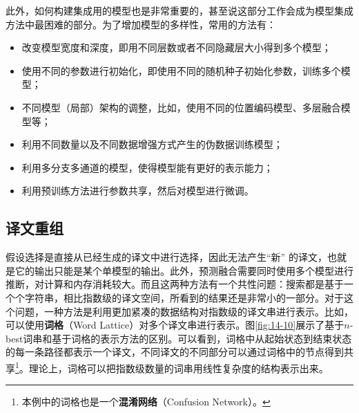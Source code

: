 \parinterval 此外，如何构建集成用的模型也是非常重要的，甚至说这部分工作会成为模型集成方法中最困难的部分。为了增加模型的多样性，常用的方法有：

\begin{itemize}
\vspace{0.5em}
\item 改变模型宽度和深度，即用不同层数或者不同隐藏层大小得到多个模型；
\vspace{0.5em}
\item 使用不同的参数进行初始化，即使用不同的随机种子初始化参数，训练多个模型；
\vspace{0.5em}
\item 不同模型（局部）架构的调整，比如，使用不同的位置编码模型、多层融合模型等；
\vspace{0.5em}
\item 利用不同数量以及不同数据增强方式产生的伪数据训练模型；
\vspace{0.5em}
\item 利用多分支多通道的模型，使得模型能有更好的表示能力；
\vspace{0.5em}
\item 利用预训练方法进行参数共享，然后对模型进行微调。
\vspace{0.5em}
\end{itemize}


\subsection{译文重组}

\parinterval 假设选择是直接从已经生成的译文中进行选择，因此无法产生“新” 的译文，也就是它的输出只能是某个单模型的输出。此外，预测融合需要同时使用多个模型进行推断，对计算和内存消耗较大。而且这两种方法有一个共性问题：搜索都是基于一个个字符串，相比指数级的译文空间，所看到的结果还是非常小的一部分。对于这个问题，一种方法是利用更加紧凑的数据结构对指数级的译文串进行表示。比如，可以使用{\small\sffamily\bfseries{词格}}（Word Lattice）对多个译文串进行表示。图\ref{fig:14-10}展示了基于$n$-best词串和基于词格的表示方法的区别。可以看到，词格中从起始状态到结束状态的每一条路径都表示一个译文，不同译文的不同部分可以通过词格中的节点得到共享\footnote{本例中的词格也是一个{\footnotesize\sffamily\bfseries{混淆网络}}（Confusion Network）。}。理论上，词格可以把指数级数量的词串用线性复杂度的结构表示出来。

